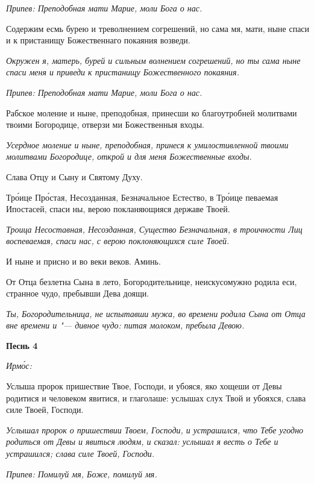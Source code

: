 \itshape Припев:\normalfont{} Преподобная мати Марие, моли Бога о нас.


Содержим есмь бурею и треволнением согрешений, но сама мя, мати, ныне спаси и к пристанищу Божественнаго покаяния возведи.


\itshape Окружен я, матерь, бурей и сильным волнением согрешений, но ты сама ныне спаси меня и приведи к пристанищу Божественного покаяния.\normalfont{}


\itshape Припев:\normalfont{} Преподобная мати Марие, моли Бога о нас.


Рабское моление и ныне, преподобная, принесши ко благоутробней молитвами твоими Богородице, отверзи ми Божественныя входы.


\itshape Усердное моление и ныне, преподобная, принеся к умилостивленной твоими молитвами Богородице, открой и для меня Божественные входы.\normalfont{}


Слава Отцу и Сыну и Святому Духу.


Тро́ице Про́стая, Несозданная, Безначальное Естество, в Тро́ице певаемая Ипостасей, спаси ны, верою покланяющияся державе Твоей.


\itshape Троица Несоставная, Несозданная, Существо Безначальная, в троичности Лиц воспеваемая, спаси нас, с верою поклоняющихся силе Твоей.\normalfont{}


И ныне и присно и во веки веков. Аминь.


От Отца безлетна Сына в лето, Богородительнице, неискусомужно родила еси, странное чудо, пребывши Дева доящи.


\itshape Ты, Богородительница, не испытавши мужа, во времени родила Сына от Отца вне времени и "--- дивное чудо: питая молоком, пребыла Девою.\normalfont{}





\bfseries Песнь 4\normalfont{}


\itshape Ирмо́с:\normalfont{}


Услыша пророк пришествие Твое, Господи, и убояся, яко хощеши от Девы родитися и человеком явитися, и глаголаше: услышах слух Твой и убояхся, слава силе Твоей, Господи.


\itshape Услышал пророк о пришествии Твоем, Господи, и устрашился, что Тебе угодно родиться от Девы и явиться людям, и сказал: услышал я весть о Тебе и устрашился; слава силе Твоей, Господи.\normalfont{}


\itshape Припев:\normalfont{} Помилуй мя, Боже, помилуй мя.


